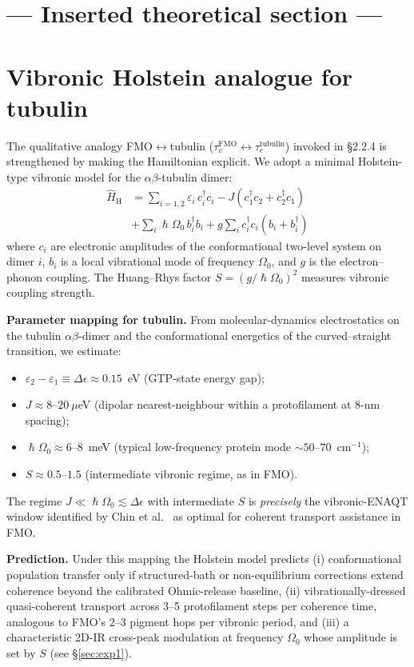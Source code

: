 \documentclass[twocolumn,10pt]{article}
\renewcommand{\hbar}{\hslash}
\begin{document}
\section*{--- Inserted theoretical section ---}
\section{Vibronic Holstein analogue for tubulin}
\label{sec:holstein}

The qualitative analogy FMO$\leftrightarrow$tubulin
($\tau_v^{\text{FMO}}\leftrightarrow\tau_c^{\text{tubulin}}$) invoked in
\S 2.2.4 is strengthened by making the Hamiltonian explicit. We adopt a
minimal Holstein-type vibronic model \cite{Holstein1959,Chin2013} for the
$\alpha\beta$-tubulin dimer:
\begin{align}
\hat{H}_{\text{H}} &= \sum_{i=1,2}\varepsilon_i\,c_i^\dagger c_i
- J(c_1^\dagger c_2 + c_2^\dagger c_1) \\
&+ \sum_i \hbar\Omega_0\,b_i^\dagger b_i
+ g\sum_i c_i^\dagger c_i(b_i+b_i^\dagger)\nonumber
\end{align}
where $c_i$ are electronic amplitudes of the conformational two-level
system on dimer $i$, $b_i$ is a local vibrational mode of frequency
$\Omega_0$, and $g$ is the electron--phonon coupling. The
Huang--Rhys factor $S=(g/\hbar\Omega_0)^2$ measures vibronic coupling
strength.

\textbf{Parameter mapping for tubulin.} From molecular-dynamics
electrostatics on the tubulin $\alpha\beta$-dimer \cite{Sept2003,Xiang2019}
and the conformational energetics of the curved--straight transition, we
estimate:
\begin{itemize}
\item $\varepsilon_2-\varepsilon_1\equiv\Delta\epsilon\approx 0.15$~eV
(GTP-state energy gap);
\item $J\approx 8\text{--}20~\mu$eV (dipolar nearest-neighbour within a
protofilament at 8-nm spacing);
\item $\hbar\Omega_0\approx 6\text{--}8$~meV (typical low-frequency
protein mode $\sim 50$--$70$~cm$^{-1}$);
\item $S\approx 0.5\text{--}1.5$ (intermediate vibronic regime, as in FMO).
\end{itemize}
The regime $J\ll\hbar\Omega_0\lesssim\Delta\epsilon$ with intermediate
$S$ is \emph{precisely} the vibronic-ENAQT window identified by
Chin et al.\ \cite{Chin2013} as optimal for coherent transport assistance
in FMO.

\textbf{Prediction.} Under this mapping the Holstein model predicts
(i) conformational population transfer only if structured-bath or
non-equilibrium corrections extend coherence beyond the calibrated
Ohmic-release baseline, (ii)
vibrationally-dressed quasi-coherent transport across 3--5 protofilament
steps per coherence time, analogous to FMO's 2--3 pigment hops per
vibronic period, and (iii) a characteristic 2D-IR cross-peak modulation at
frequency $\Omega_0$ whose amplitude is set by $S$ (see \S\ref{sec:exp1}).
\end{document}
